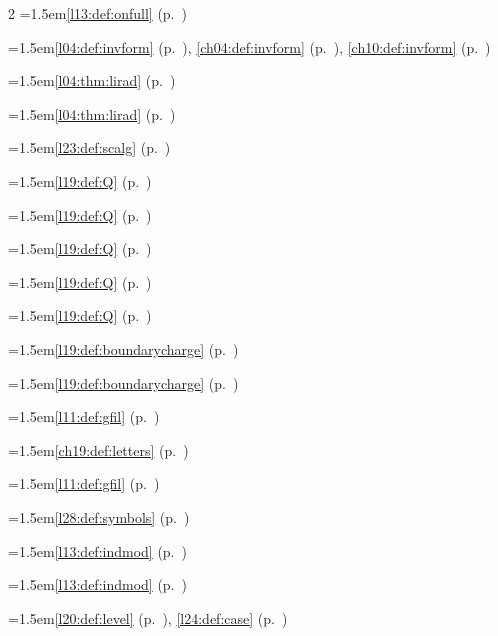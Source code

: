 \begin{multicols}{2}
\hangindent=1.5em\quad \ref{l13:def:onfull} (p.~\pageref{l13:def:onfull})\par
\hangindent=1.5em\quad \ref{l04:def:invform} (p.~\pageref{l04:def:invform}), \ref{ch04:def:invform} (p.~\pageref{ch04:def:invform}), \ref{ch10:def:invform} (p.~\pageref{ch10:def:invform})\par
\hangindent=1.5em\quad \ref{l04:thm:lirad} (p.~\pageref{l04:thm:lirad})\par
\hangindent=1.5em\quad \ref{l04:thm:lirad} (p.~\pageref{l04:thm:lirad})\par
\hangindent=1.5em\quad \ref{l23:def:scalg} (p.~\pageref{l23:def:scalg})\par
\hangindent=1.5em\quad \ref{l19:def:Q} (p.~\pageref{l19:def:Q})\par
\hangindent=1.5em\quad \ref{l19:def:Q} (p.~\pageref{l19:def:Q})\par
\hangindent=1.5em\quad \ref{l19:def:Q} (p.~\pageref{l19:def:Q})\par
\hangindent=1.5em\quad \ref{l19:def:Q} (p.~\pageref{l19:def:Q})\par
\hangindent=1.5em\quad \ref{l19:def:Q} (p.~\pageref{l19:def:Q})\par
\hangindent=1.5em\quad \ref{l19:def:boundarycharge} (p.~\pageref{l19:def:boundarycharge})\par
\hangindent=1.5em\quad \ref{l19:def:boundarycharge} (p.~\pageref{l19:def:boundarycharge})\par
\hangindent=1.5em\quad \ref{l11:def:gfil} (p.~\pageref{l11:def:gfil})\par
\hangindent=1.5em\quad \ref{ch19:def:letters} (p.~\pageref{ch19:def:letters})\par
\hangindent=1.5em\quad \ref{l11:def:gfil} (p.~\pageref{l11:def:gfil})\par
\hangindent=1.5em\quad \ref{l28:def:symbols} (p.~\pageref{l28:def:symbols})\par
\hangindent=1.5em\quad \ref{l13:def:indmod} (p.~\pageref{l13:def:indmod})\par
\hangindent=1.5em\quad \ref{l13:def:indmod} (p.~\pageref{l13:def:indmod})\par
\hangindent=1.5em\quad \ref{l20:def:level} (p.~\pageref{l20:def:level}), \ref{l24:def:case} (p.~\pageref{l24:def:case})\par

\end{multicols}
